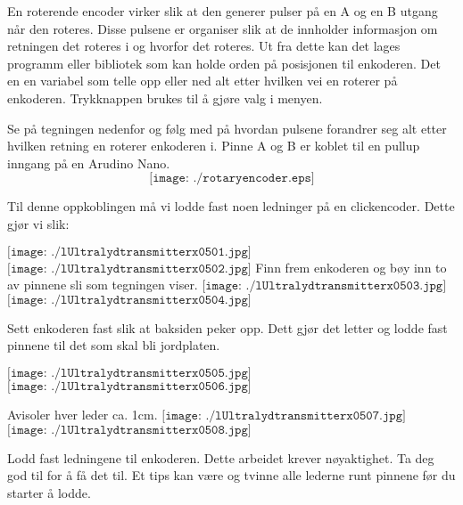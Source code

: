 En roterende encoder virker slik at den generer pulser på en A og en B utgang når den roteres. Disse pulsene er organiser slik at de innholder informasjon om retningen det roteres i og hvorfor det roteres. Ut fra dette kan det lages programm eller bibliotek som kan holde orden på posisjonen til enkoderen. Det en en variabel som telle opp eller ned  alt etter hvilken vei en roterer på enkoderen. 
\vskip 5pt 
Trykknappen brukes til å gjøre valg i menyen. 
\vskip 10pt 

Se på tegningen nedenfor og følg med på hvordan pulsene forandrer seg alt etter hvilken retning en roterer enkoderen i. Pinne A og B er koblet til en pullup inngang på en Arudino Nano. 
$$\texttt{[image: ./rotaryencoder.eps]}$$

\vskip 10pt 

Til denne oppkoblingen må vi lodde fast noen ledninger på en clickencoder. Dette  gjør vi slik:
\vskip 5pt 

\vskip 10pt 
$\texttt{[image: ./lUltralydtransmitterx0501.jpg]}$
$\texttt{[image: ./lUltralydtransmitterx0502.jpg]}$
Finn frem enkoderen og bøy inn to av pinnene sli som tegningen viser. 
\vskip 5pt 
$\texttt{[image: ./lUltralydtransmitterx0503.jpg]}$
$\texttt{[image: ./lUltralydtransmitterx0504.jpg]}$

\vskip 5pt 
Sett enkoderen fast slik at baksiden peker opp. Dett gjør det letter og lodde fast pinnene til det som skal bli jordplaten. 

$\texttt{[image: ./lUltralydtransmitterx0505.jpg]}$
$\texttt{[image: ./lUltralydtransmitterx0506.jpg]}$

\vskip 5pt 
Avisoler hver leder ca. 1cm.
\vskip 10pt 
$\texttt{[image: ./lUltralydtransmitterx0507.jpg]}$
$\texttt{[image: ./lUltralydtransmitterx0508.jpg]}$

\vskip 5pt 
Lodd fast ledningene til enkoderen. Dette arbeidet krever nøyaktighet. Ta deg god til for å få det til. Et tips kan være og tvinne alle lederne runt pinnene før du starter å lodde.
\vskip 5pt 



